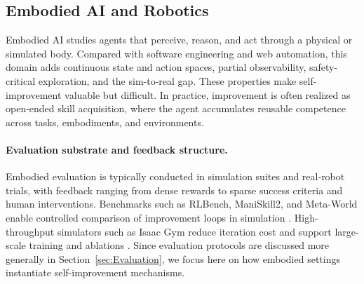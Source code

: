 \documentclass{article}
\begin{document}
\subsection{Embodied AI and Robotics}

Embodied AI studies agents that perceive, reason, and act through a physical or simulated body. Compared with software engineering and web automation, this domain adds continuous state and action spaces, partial observability, safety-critical exploration, and the sim-to-real gap. These properties make self-improvement valuable but difficult. In practice, improvement is often realized as open-ended skill acquisition, where the agent accumulates reusable competence across tasks, embodiments, and environments.

\paragraph{Evaluation substrate and feedback structure.}
Embodied evaluation is typically conducted in simulation suites and real-robot trials, with feedback ranging from dense rewards to sparse success criteria and human interventions. Benchmarks such as RLBench, ManiSkill2, and Meta-World enable controlled comparison of improvement loops in simulation \citep{james2019rlbench, gu2023maniskill2unifiedbenchmarkgeneralizable, yu2020meta}. High-throughput simulators such as Isaac Gym reduce iteration cost and support large-scale training and ablations \citep{makoviychuk2021isaac}. Since evaluation protocols are discussed more generally in Section~\ref{sec:Evaluation}, we focus here on how embodied settings instantiate self-improvement mechanisms.
\end{document}
